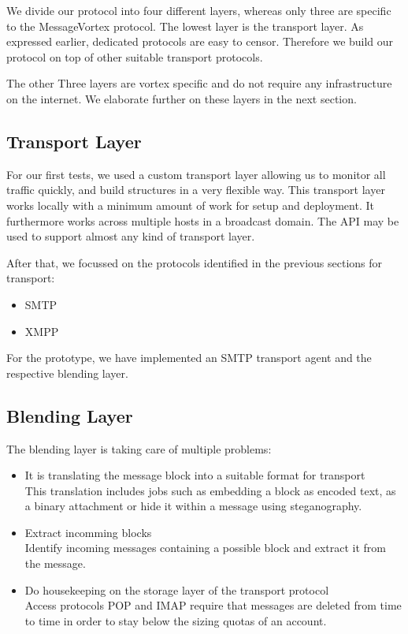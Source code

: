 We divide our protocol into four different layers, whereas only three are specific to the MessageVortex protocol. The lowest layer is the transport layer. As expressed earlier, dedicated protocols are easy to censor. Therefore we build our protocol on top of other suitable transport protocols. 

The other Three layers are vortex specific and do not require any infrastructure on the internet. We elaborate further on these layers in the next section.

\subsection{Transport Layer}
For our first tests, we used a custom transport layer allowing us to monitor all traffic quickly, and build structures in a very flexible way. This transport layer works locally with a minimum amount of work for setup and deployment. It furthermore works across multiple hosts in a broadcast domain. The API may be used to support almost any kind of transport layer.

After that, we focussed on the protocols identified in the previous sections for transport:
\begin{itemize}
	\item SMTP
	\item XMPP
\end{itemize}
For the prototype, we have implemented an SMTP transport agent and the respective blending layer.

\subsection{Blending Layer}
The blending layer is taking care of multiple problems:
\begin{itemize}
	\item It is translating the message block into a suitable format for transport\\
	      This translation includes jobs such as embedding a block as encoded text, as a binary attachment or hide it within a message using steganography.
	\item Extract incomming blocks\\
          Identify incoming messages containing a possible block and extract it from the message.
	\item Do housekeeping on the storage layer of the transport protocol\\
	      Access protocols POP and IMAP require that messages are deleted from time to time in order to stay below the sizing quotas of an account.      
\end{itemize}

